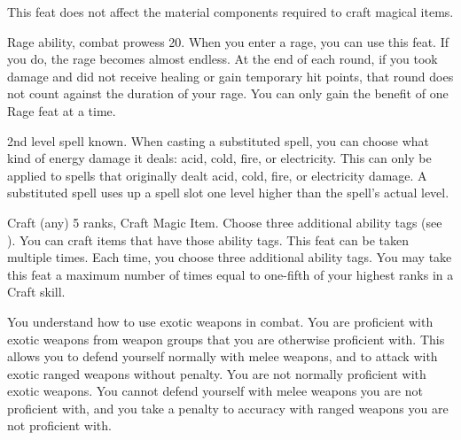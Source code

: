 This feat does not affect the material components required to craft magical items.

\featpres Rage ability, combat prowess 20.
\featben When you enter a rage, you can use this feat. If you do, the rage becomes almost endless. At the end of each round, if you took damage and did not receive healing or gain temporary hit points, that round does not count against the duration of your rage.
 You can only gain the benefit of one Rage feat at a time.

\featpre 2nd level spell known.
\featben When casting a substituted spell, you can choose what kind of energy damage it deals: acid, cold, fire, or electricity.
This can only be applied to spells that originally dealt acid, cold, fire, or electricity damage.
A substituted spell uses up a spell slot one level higher than the spell's actual level.

\featpres Craft (any) 5 ranks, Craft Magic Item.
\featben Choose three additional ability tags (see ).
You can craft items that have those ability tags.
 This feat can be taken multiple times.
Each time, you choose three additional ability tags.
You may take this feat a maximum number of times equal to one-fifth of your highest ranks in a Craft skill.

You understand how to use exotic weapons in combat.
\featben You are proficient with exotic weapons from weapon groups that you are otherwise proficient with.
This allows you to defend yourself normally with melee weapons, and to attack with exotic ranged weapons without penalty.
You are not normally proficient with exotic weapons.
You cannot defend yourself with melee weapons you are not proficient with, and you take a  penalty to accuracy with ranged weapons you are not proficient with.

